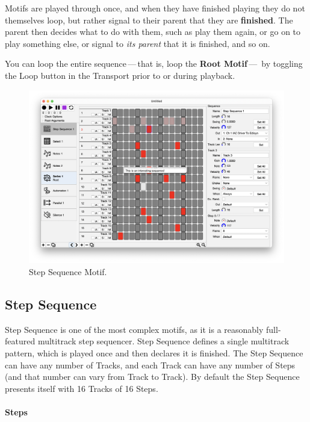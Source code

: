 \documentclass[twoside,10pt]{article}
\begin{document}
\vspace{1em}

Motifs are played through once, and when they have finished playing they do not themselves loop, but rather signal to their parent that they are {\bf finished}.  The parent then decides what to do with them, such as play them again, or go on to play something else, or signal to {\it its parent} that it is finished, and so on.

You can loop the entire sequence\,---\,that is, loop the {\bf Root Motif}\,---\, by toggling the Loop button in the Transport prior to or during playback.

\clearpage

\begin{figure}[t]
\centering
\includegraphics[width=6.5in]{StepSequence}
\vspace{-2em}
\caption{Step Sequence Motif.}
\label{stepsequence}
\end{figure}

\subsection{Step Sequence}

Step Sequence is one of the most complex motifs, as it is a reasonably full-featured multitrack step sequencer.  Step Sequence defines a single multitrack pattern, which is played once and then declares it is finished.  The Step Sequence can have any number of Tracks, and each Track can have any number of Steps (and that number can vary from Track to Track).  By default the Step Sequence presents itself with 16 Tracks of 16 Steps.  

\paragraph{Steps}
\end{document}
